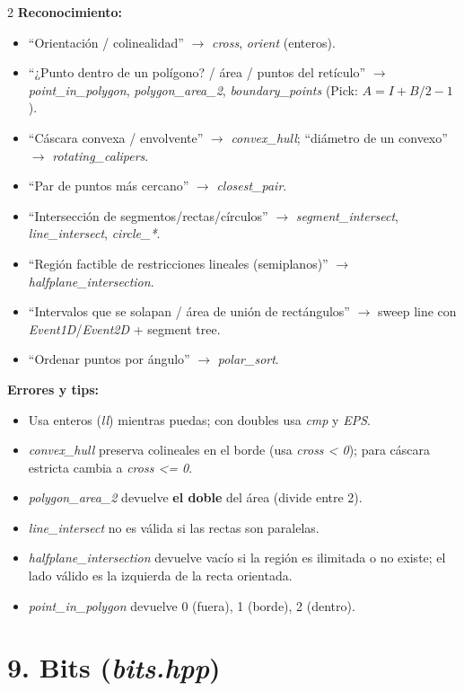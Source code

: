 \documentclass[10pt]{article}
\begin{document}
\begin{multicols}{2}
\textbf{Reconocimiento:}
\begin{itemize}\setlength{\itemsep}{1pt}
  \item ``Orientación / colinealidad'' $\to$ \textit{cross}, \textit{orient} (enteros).
  \item ``¿Punto dentro de un polígono? / área / puntos del retículo'' $\to$ \textit{point\_in\_polygon}, \textit{polygon\_area\_2}, \textit{boundary\_points} (Pick: $A = I + B/2 - 1$).
  \item ``Cáscara convexa / envolvente'' $\to$ \textit{convex\_hull}; ``diámetro de un convexo'' $\to$ \textit{rotating\_calipers}.
  \item ``Par de puntos más cercano'' $\to$ \textit{closest\_pair}.
  \item ``Intersección de segmentos/rectas/círculos'' $\to$ \textit{segment\_intersect}, \textit{line\_intersect}, \textit{circle\_*}.
  \item ``Región factible de restricciones lineales (semiplanos)'' $\to$ \textit{halfplane\_intersection}.
  \item ``Intervalos que se solapan / área de unión de rectángulos'' $\to$ sweep line con \textit{Event1D}/\textit{Event2D} + segment tree.
  \item ``Ordenar puntos por ángulo'' $\to$ \textit{polar\_sort}.
\end{itemize}

\textbf{Errores y tips:}
\begin{itemize}\setlength{\itemsep}{1pt}
  \item Usa enteros (\textit{ll}) mientras puedas; con doubles usa \textit{cmp} y \textit{EPS}.
  \item \textit{convex\_hull} preserva colineales en el borde (usa \textit{cross < 0}); para cáscara estricta cambia a \textit{cross <= 0}.
  \item \textit{polygon\_area\_2} devuelve \textbf{el doble} del área (divide entre 2).
  \item \textit{line\_intersect} no es válida si las rectas son paralelas.
  \item \textit{halfplane\_intersection} devuelve vacío si la región es ilimitada o no existe; el lado válido es la izquierda de la recta orientada.
  \item \textit{point\_in\_polygon} devuelve 0 (fuera), 1 (borde), 2 (dentro).
\end{itemize}

\section*{9. Bits (\textit{bits.hpp})}


\end{multicols}
\end{document}

